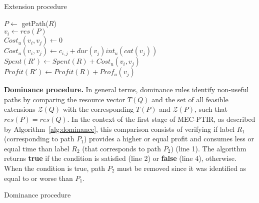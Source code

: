 \begin{algorithm}
\label{alg:extension}

\caption{Extension procedure}
\DontPrintSemicolon
\small
{}

\BlankLine
\BlankLine
$P \gets$ getPath($R$)\\
$v_i \gets res(P)$\\
{
    $Cost_{u}(v_i,v_j) \gets 0$\\
}
\Else
{
$Cost_{u}(v_i,v_j) \gets c_{i,j} + dur(v_{j})int_u(cat(v_j))$\\
}
$Spent(R') \gets Spent(R) + Cost_{u}(v_i,v_j)$\\
$Profit(R') \gets Profit(R) + Prof_u(v_j)$\\

{
}
\Else
{
}
\end{algorithm}

\noindent\textbf{Dominance procedure.} In general terms, dominance rules identify non-useful paths by comparing the resource vector $T(Q)$ and the set of all feasible extensions $\mathcal{Z}(Q)$ with the corresponding $T(P)$ and $\mathcal{Z}(P)$, such that $res(P) = res(Q)$. In the context of the first stage of MEC-PTIR, as described by Algorithm~\ref{alg:dominance}, this comparison consists of verifying if label $R_1$ (corresponding to path $P_1$) provides a higher or equal profit and consumes less or equal time than label $R_2$ (that corresponds to path $P_2$) (line 1). The algorithm returns \textbf{true} if the condition is satisfied (line 2) or \textbf{false} (line 4), otherwise. When the condition is true, path $P_2$  must be removed since it was identified as equal to or worse than $P_1$.

\begin{algorithm}
\label{alg:dominance}

\caption{Dominance procedure}
\DontPrintSemicolon
\small
{}

\BlankLine
\BlankLine
{}
{
}
\Else
{
}
\end{algorithm}

